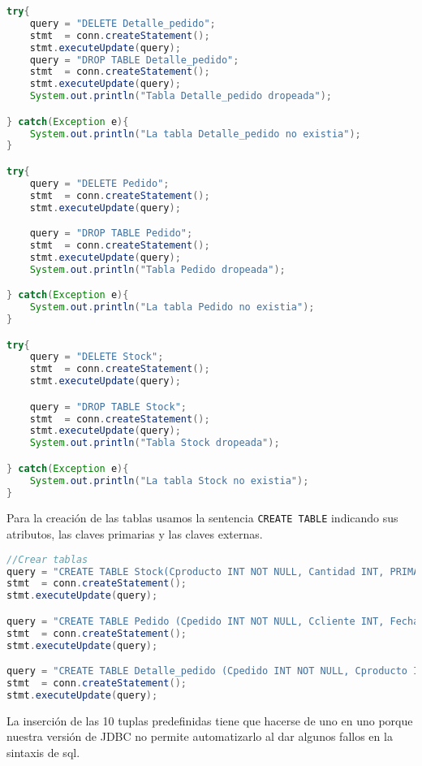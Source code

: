 \begin{lstlisting}[language=Java]
try{
	query = "DELETE Detalle_pedido";
	stmt  = conn.createStatement();
	stmt.executeUpdate(query);
	query = "DROP TABLE Detalle_pedido";
	stmt  = conn.createStatement();
	stmt.executeUpdate(query);
	System.out.println("Tabla Detalle_pedido dropeada");

} catch(Exception e){
	System.out.println("La tabla Detalle_pedido no existia");
}

try{
	query = "DELETE Pedido";
	stmt  = conn.createStatement();
	stmt.executeUpdate(query);

	query = "DROP TABLE Pedido";
	stmt  = conn.createStatement();
	stmt.executeUpdate(query);
	System.out.println("Tabla Pedido dropeada");

} catch(Exception e){
	System.out.println("La tabla Pedido no existia");
}

try{
	query = "DELETE Stock";
	stmt  = conn.createStatement();
	stmt.executeUpdate(query);

	query = "DROP TABLE Stock";
	stmt  = conn.createStatement();
	stmt.executeUpdate(query);
	System.out.println("Tabla Stock dropeada");

} catch(Exception e){
	System.out.println("La tabla Stock no existia");
}
\end{lstlisting}

Para la creación de las tablas usamos la sentencia \texttt{CREATE TABLE} indicando sus atributos, las claves primarias y las claves externas.

\begin{lstlisting}[language=Java]
//Crear tablas
query = "CREATE TABLE Stock(Cproducto INT NOT NULL, Cantidad INT, PRIMARY KEY (Cproducto))";
stmt  = conn.createStatement();
stmt.executeUpdate(query);

query = "CREATE TABLE Pedido (Cpedido INT NOT NULL, Ccliente INT, Fecha_pedido DATE, PRIMARY KEY (Cpedido))";
stmt  = conn.createStatement();
stmt.executeUpdate(query);

query = "CREATE TABLE Detalle_pedido (Cpedido INT NOT NULL, Cproducto INT NOT NULL, Cantidad int,FOREIGN KEY(Cpedido) REFERENCES Pedido(Cpedido),FOREIGN KEY(Cproducto) REFERENCES Stock(Cproducto),PRIMARY KEY(Cpedido,Cproducto))";
stmt  = conn.createStatement();
stmt.executeUpdate(query);
\end{lstlisting}

La inserción de las 10 tuplas predefinidas tiene que hacerse de uno en uno porque nuestra versión de JDBC no permite automatizarlo al dar algunos fallos en la sintaxis de sql.

